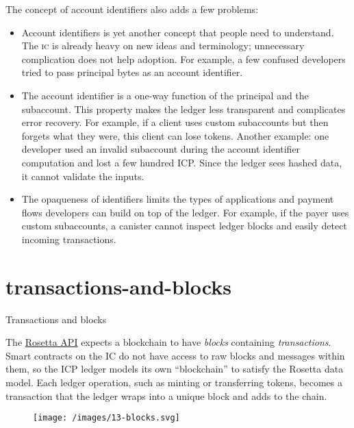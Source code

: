 \documentclass{article}
\begin{document}
The concept of account identifiers also adds a few problems:
\begin{itemize}
  \item
    Account identifiers is yet another concept that people need to understand.
    The \textsc{ic} is already heavy on new ideas and terminology; unnecessary complication does not help adoption.
    For example, a few confused developers tried to pass principal bytes as an account identifier.
  \item
    The account identifier is a one-way function of the principal and the subaccount.
    This property makes the ledger less transparent and complicates error recovery.
    For example, if a client uses custom subaccounts but then forgets what they were, this client can lose tokens.
    Another example: one developer used an invalid subaccount during the account identifier computation and lost a few hundred ICP.
    Since the ledger sees hashed data, it cannot validate the inputs.
  \item
    The opaqueness of identifiers limits the types of applications and payment flows developers can build on top of the ledger.
    For example, if the payer uses custom subaccounts, a canister cannot inspect ledger blocks and easily detect incoming transactions.
\end{itemize}

\section{transactions-and-blocks}{Transactions and blocks}

The \href{https://rosetta-api.org}{Rosetta API} expects a blockchain to have \emph{blocks} containing \emph{transactions}.
Smart contracts on the IC do not have access to raw blocks and messages within them, so the ICP ledger models its own ``blockchain'' to satisfy the Rosetta data model. 
Each ledger operation, such as minting or transferring tokens, becomes a transaction that the ledger wraps into a unique block and adds to the chain.

\begin{figure}[grayscale-diagram]
\texttt{[image: /images/13-blocks.svg]}
\end{figure}
\end{document}
